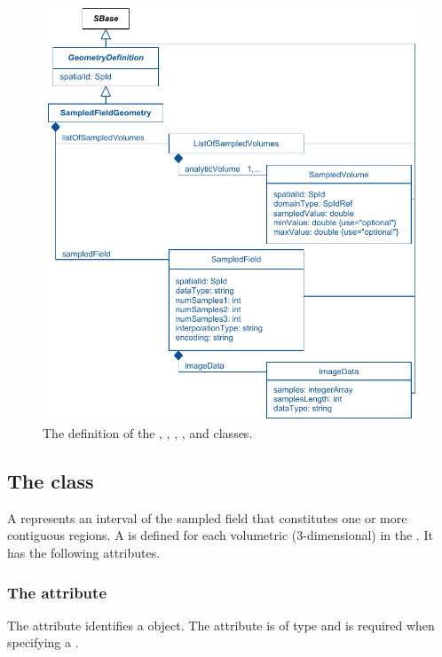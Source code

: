 \begin{figure}[ht]
  \includegraphics{figs/SampledFieldGeometry-uml}
  \caption{The definition of the \SampledFieldGeometry, \ListOfSampledVolumes, \SampledVolume, \SampledField, and \ImageData classes.}
  \label{SampledFieldGeometry-uml}
  \label{ListOfSampledVolumes-uml}
  \label{SampledVolume-uml}
  \label{SampledField-uml}
  \label{ImageData-uml}
\end{figure}



\subsection{The  class}
\label{SampledVolume-class}
A \SampledVolume represents an interval of the sampled field that constitutes one or more contiguous regions. A \SampledVolume is defined for each volumetric (3-dimensional) \Domain in the \Geometry. It has the following attributes.

\subsubsection{The  attribute}
The  attribute identifies a \SampledVolume object. The attribute is of type  and is required when specifying a \SampledVolume.

